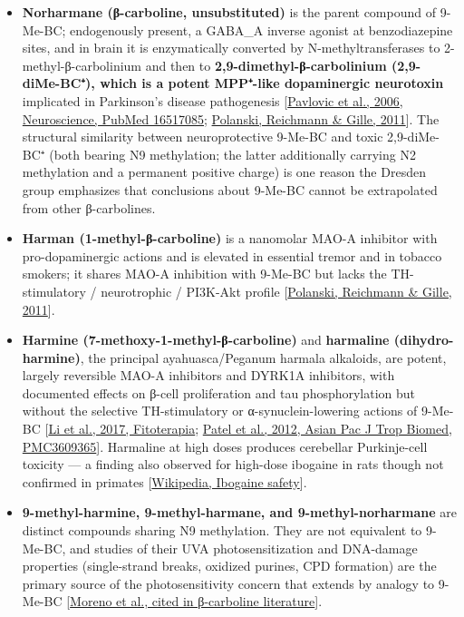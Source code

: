 \begin{itemize}
\tightlist
\item
  \textbf{Norharmane (β-carboline, unsubstituted)} is the parent compound of 9-Me-BC; endogenously present, a GABA\_A inverse agonist at benzodiazepine sites, and in brain it is enzymatically converted by N-methyltransferases to 2-methyl-β-carbolinium and then to \textbf{2,9-dimethyl-β-carbolinium (2,9-diMe-BC⁺), which is a potent MPP⁺-like dopaminergic neurotoxin} implicated in Parkinson's disease pathogenesis {[}\href{https://pubmed.ncbi.nlm.nih.gov/16517085/}{Pavlovic et al., 2006, Neuroscience, PubMed 16517085}; \href{https://pubmed.ncbi.nlm.nih.gov/21651332/}{Polanski, Reichmann \& Gille, 2011}{]}. The structural similarity between neuroprotective 9-Me-BC and toxic 2,9-diMe-BC⁺ (both bearing N9 methylation; the latter additionally carrying N2 methylation and a permanent positive charge) is one reason the Dresden group emphasizes that conclusions about 9-Me-BC cannot be extrapolated from other β-carbolines.
\item
  \textbf{Harman (1-methyl-β-carboline)} is a nanomolar MAO-A inhibitor with pro-dopaminergic actions and is elevated in essential tremor and in tobacco smokers; it shares MAO-A inhibition with 9-Me-BC but lacks the TH-stimulatory / neurotrophic / PI3K-Akt profile {[}\href{https://pubmed.ncbi.nlm.nih.gov/21651332/}{Polanski, Reichmann \& Gille, 2011}{]}.
\item
  \textbf{Harmine (7-methoxy-1-methyl-β-carboline)} and \textbf{harmaline (dihydro-harmine)}, the principal ayahuasca/Peganum harmala alkaloids, are potent, largely reversible MAO-A inhibitors and DYRK1A inhibitors, with documented effects on β-cell proliferation and tau phosphorylation but without the selective TH-stimulatory or α-synuclein-lowering actions of 9-Me-BC {[}\href{https://www.sciencedirect.com/science/article/abs/pii/S0944711319301357}{Li et al., 2017, Fitoterapia}; \href{https://pmc.ncbi.nlm.nih.gov/articles/PMC3609365/}{Patel et al., 2012, Asian Pac J Trop Biomed, PMC3609365}{]}. Harmaline at high doses produces cerebellar Purkinje-cell toxicity --- a finding also observed for high-dose ibogaine in rats though not confirmed in primates {[}\href{https://en.wikipedia.org/wiki/Ibogaine}{Wikipedia, Ibogaine safety}{]}.
\item
  \textbf{9-methyl-harmine, 9-methyl-harmane, and 9-methyl-norharmane} are distinct compounds sharing N9 methylation. They are not equivalent to 9-Me-BC, and studies of their UVA photosensitization and DNA-damage properties (single-strand breaks, oxidized purines, CPD formation) are the primary source of the photosensitivity concern that extends by analogy to 9-Me-BC {[}\href{https://www.researchgate.net/publication/5932301_9-Methyl-beta-carboline_up-regulates_the_appearance_of_differentiated_dopaminergic_neurones_in_primary_mesencephalic_culture}{Moreno et al., cited in β-carboline literature}{]}.
\end{itemize}


